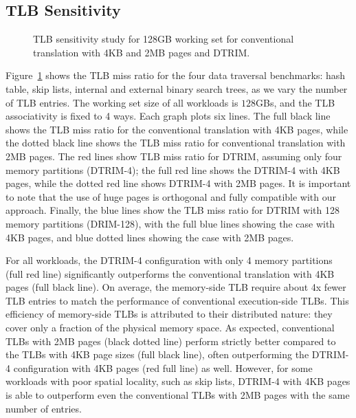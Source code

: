 \subsection{TLB Sensitivity}
\begin{figure}[t]
    \centering
    \caption{TLB sensitivity study for 128GB working set for conventional translation with 4KB and 2MB pages and DTRIM.}
    \label{fig:miss_ratio_128GB}
\end{figure}
Figure~\ref{fig:miss_ratio_128GB} shows the TLB miss ratio for the four data traversal benchmarks: hash table, skip lists, internal and external binary search trees, as we vary the number of TLB entries. The working set size of all workloads is $128$GBs, and the TLB associativity is fixed to 4 ways. Each graph plots six lines. The full black line shows the TLB miss ratio for the conventional translation with 4KB pages, while the dotted black line shows the TLB miss ratio for conventional translation with 2MB pages. The red lines show TLB miss ratio for DTRIM, assuming only four memory partitions (DTRIM-4); the full red line shows the DTRIM-4 with 4KB pages, while the dotted red line shows DTRIM-4 with 2MB pages. It is important to note that the use of huge pages is orthogonal and fully compatible with our approach. Finally, the blue lines show the TLB miss ratio for DTRIM with 128 memory partitions (DRIM-128), with the full blue lines showing the case with 4KB pages, and blue dotted lines showing the case with 2MB pages. 

For all workloads, the DTRIM-4 configuration with only 4 memory partitions (full red line) significantly outperforms the conventional translation with 4KB pages (full black line). On average, the memory-side TLB require about 4x fewer TLB entries to match the performance of conventional execution-side TLBs. This efficiency of memory-side TLBs is attributed to their distributed nature: they cover only a fraction of the physical memory space. As expected, conventional TLBs with 2MB pages (black dotted line) perform strictly better compared to the TLBs with 4KB page sizes (full black line), often outperforming the DTRIM-4 configuration with 4KB pages (red full line) as well. However, for some workloads with poor spatial locality, such as skip lists, DTRIM-4 with 4KB pages is able to outperform even the conventional TLBs with 2MB pages with the same number of entries. 

